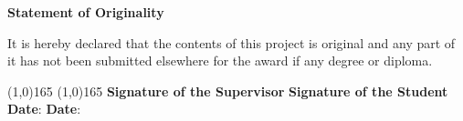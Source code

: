 \begin{center}
{\Large \textbf{Statement of Originality}}
\end{center}

\vspace{10mm}
\justify
It is hereby declared that the contents of this project is original and any part of it has not been submitted elsewhere for the award if any degree or diploma.

\vspace{50mm}

\justify
\line(1,0){165} \hfill \line(1,0){165} \newline
\textbf{Signature of the Supervisor}	 \hfill \textbf{Signature of the Student}	\newline
\textbf{Date}:  \hspace{74.5mm} \textbf{Date}: \newline